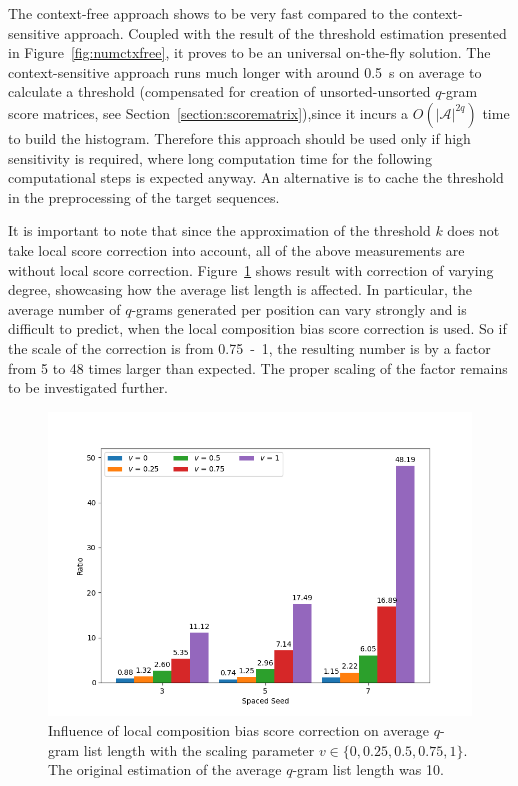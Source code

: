 \documentclass[twoside,a4paper,bsc]{master}
\newcommand{\Qgram}[1]{\(#1\)-gram}
\newcommand{\Alpha}[0]{\mathcal{A}}
\begin{document}
The context-free approach shows to be very fast compared to the 
context-sensitive approach.
Coupled with the result of the threshold estimation presented in 
Figure~\ref{fig:numctxfree}, it proves to be an
universal on-the-fly solution. The context-sensitive approach runs much longer
with around 0.5~s on average to calculate a threshold (compensated for
creation of unsorted-unsorted \Qgram{q} score matrices, see
Section~\ref{section:scorematrix}),since it incurs a \(O(|\Alpha|^{2q})\)
time to build the histogram. Therefore this approach should be used only if
high sensitivity is required, where long computation time for the following
computational steps is expected anyway. An alternative is to cache the
threshold in the preprocessing of the target sequences.

It is important to note that since the approximation of the threshold \(k\)
does not take local score correction into account, all of the above
measurements are without local score correction.
Figure~\ref{fig:compbias} shows result with correction of varying
degree, showcasing how the average list length is affected. In particular,
the average number of \Qgram{q}s generated per position can vary strongly
and is difficult to predict, when the
local composition bias score correction is used. So if the scale
of the correction is from 0.75~-~1, the resulting number is by a factor from
5 to 48 times larger than expected. The proper scaling of the
factor remains to be investigated further.

\begin{figure}
\centering
\includegraphics[scale=0.6]{graphics/comp_bias.png}
\caption{Influence of local composition bias score correction on average
\Qgram{q} list length with the scaling parameter \(v\in\{0,0.25,0.5,0.75,1\}\). 
The original estimation of the average \Qgram{q} list length was 10.}
\label{fig:compbias}
\end{figure}
\end{document}
